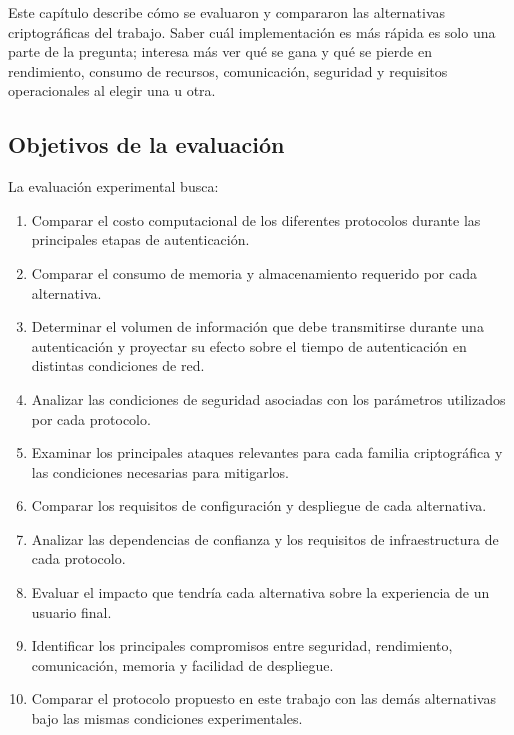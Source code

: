 \label{chap:benchmark}

Este capítulo describe cómo se evaluaron y compararon las alternativas criptográficas del trabajo. 
Saber cuál implementación es más rápida es solo una parte de la pregunta; interesa más ver qué se 
gana y qué se pierde en rendimiento, consumo de recursos, comunicación, seguridad y requisitos operacionales al elegir una u otra.

\subsection{Objetivos de la evaluación}
\label{sec:benchmark-objectives}

La evaluación experimental busca:

\begin{enumerate}
    \item Comparar el costo computacional de los diferentes protocolos durante las
    principales etapas de autenticación.

    \item Comparar el consumo de memoria y almacenamiento requerido por cada
    alternativa.

    \item Determinar el volumen de información que debe transmitirse durante una
    autenticación y proyectar su efecto sobre el tiempo de autenticación en distintas
    condiciones de red.

    \item Analizar las condiciones de seguridad asociadas con los parámetros utilizados
    por cada protocolo.

    \item Examinar los principales ataques relevantes para cada familia criptográfica
    y las condiciones necesarias para mitigarlos.

    \item Comparar los requisitos de configuración y despliegue de cada alternativa.

    \item Analizar las dependencias de confianza y los requisitos de infraestructura de
    cada protocolo.

    \item Evaluar el impacto que tendría cada alternativa sobre la experiencia de un
    usuario final.

    \item Identificar los principales compromisos entre seguridad, rendimiento,
    comunicación, memoria y facilidad de despliegue.

    \item Comparar el protocolo propuesto en este trabajo con las demás alternativas
    bajo las mismas condiciones experimentales.
\end{enumerate}


